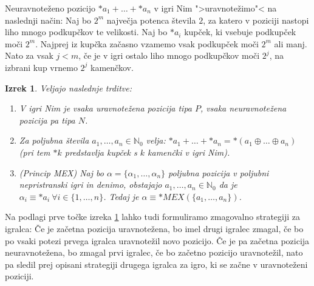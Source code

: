 \documentclass[a4paper, 10pt]{article}
\newtheorem{izr}{Izrek}
\newcommand{\mth}[1]{\ensuremath{\mathbb{#1}}}
\newcommand{\No}{\mth{N}_0}
\begin{document}
	Neuravnoteženo pozicijo $*a_1 + \ldots + *a_n$ v igri Nim ">uravnotežimo"< na naslednji način: Naj bo $2^m$ največja potenca števila $2$, za katero v poziciji nastopi liho mnogo podkupčkov te velikosti. Naj bo $*a_i$ kupček, ki vsebuje podkupček moči $2^m$. Najprej iz kupčka začasno vzamemo vsak podkupček moči $2^m$ ali manj. Nato za vsak $j < m$, če je v igri ostalo liho mnogo podkupčkov moči $2^j$, na izbrani kup vrnemo $2^j$ kamenčkov.
	
	\begin{izr}\label{izr:MEX} Veljajo naslednje trditve:
		\begin{enumerate}
			\item V igri Nim je vsaka uravnotežena pozicija tipa $P$, vsaka neuravnotežena pozicija pa tipa $N$.
			\item Za poljubna števila $a_1, \ldots, a_n \in \No$ velja: $*a_1+ \ldots+ *a_n = *(a_1\oplus \ldots\oplus a_n)$ (pri tem $*k$ predstavlja kupček s $k$ kamenčki v igri Nim).
			\item (Princip MEX) Naj bo $\alpha = \{\alpha_1, \ldots, \alpha_n\}$ poljubna pozicija v poljubni nepristranski igri in denimo, obstajajo $a_1, \ldots, a_n\in\No$ da je $\alpha_i \equiv *a_i~\forall i \in \{1, \ldots, n\}$. Tedaj je $\alpha \equiv *MEX(\{a_1, \ldots, a_n\})$.
		\end{enumerate}
	\end{izr}
	
	Na podlagi prve točke izreka \ref{izr:MEX} lahko tudi formuliramo zmagovalno strategiji za igralca: Če je začetna pozicija uravnotežena, bo imel drugi igralec zmagal, če bo po vsaki potezi prvega igralca uravnotežil novo pozicijo. Če je pa začetna pozicija neuravnotežena, bo zmagal prvi igralec, če bo začetno pozicijo uravnotežil, nato pa sledil prej opisani strategiji drugega igralca za igro, ki se začne v uravnoteženi poziciji.
	
\end{document}
